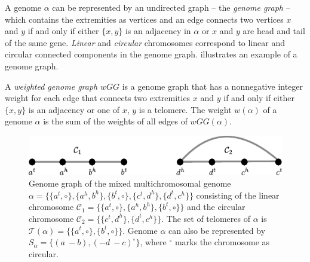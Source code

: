 \documentclass{svmult}
\begin{document}
A genome $\alpha$ can be represented by an undirected graph -- the \emph{genome graph} -- which contains the
extremities as vertices and an edge connects two vertices $x$ and $y$ if and
only if either $\{x,y\}$ is an adjacency in $\alpha$ or $x$ and $y$ are head and tail of the same gene.
\emph{Linear} and \emph{circular} chromosomes correspond to linear and 
circular connected components in the genome graph. 
 illustrates an example of a genome graph.
%

A \emph{weighted genome graph} $wGG$ is a genome graph that has a nonnegative integer
weight for each edge that connects two extremities $x$ and $y$ if and only if either
$\{x, y\}$ is an adjacency or one of $x$, $y$ is a telomere. The weight $w(\alpha)$ of a
genome $\alpha$ is the sum of the weights of all edges of $wGG(\alpha)$.  

\begin{figure}
	\centering
	\includegraphics[width=.65\textwidth]{figures/genome_graph_example.pdf}
	\caption{Genome graph of the mixed multichromosomal genome
	$\alpha=\{\{a^t,\circ\},\{a^h,b^h\},\{b^t,\circ\},
	\{c^t,d^h\},\{d^t,c^h\}\}$ consisting of the linear chromosome
	$\mathcal{C}_1=\{\{a^t,\circ\},\{a^h,b^h\},\{b^t,\circ\}\}$ 
	and the circular chromosome $\mathcal{C}_2=\{\{c^t,d^h\},\{d^t,c^h\}\}$.
	The set of telomeres of $\alpha$ is
	$\mathcal{T}(\alpha)=\{\{a^t,\circ\},\{b^t,\circ\}\}$.
	Genome $\alpha$ can also be represented by $S_\alpha=\{
	(a~-{b}),(-{d}~-{c})^\circ\}$, where $^\circ$ marks the chromosome as
	circular.}
	\label{fig:genome_graph}
\end{figure}
\end{document}
